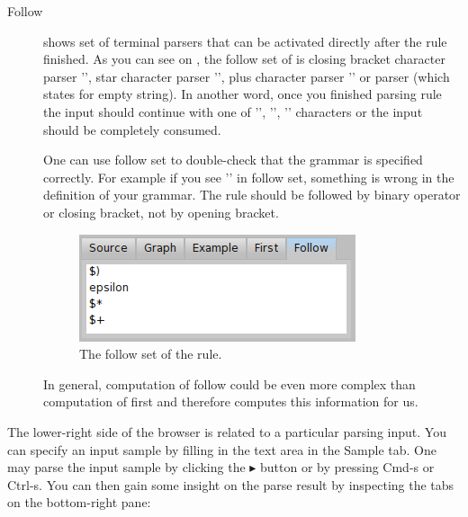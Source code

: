 \documentclass[a4paper,10pt,twoside]{book}
\begin{document}
\begin{description}
\item[Follow] shows set of terminal parsers that can be activated directly 
    after the rule finished.
  As you can see on , the follow set of  is 
    closing bracket character parser '\ct{)}', star character parser '\ct{*}', 
    plus character parser '\ct{+}' or  parser (which states for empty string).
  In another word, once you finished parsing  rule the input should
    continue with one of '\ct{)}', '\ct{*}', '\ct{+}' characters or the input should be completely consumed.
  
  One can use follow set to double-check that the grammar is specified correctly.
  For example if you see '\ct{(}' in  follow set, something is wrong
    in the definition of your grammar. 
  The  rule should be followed by binary operator or closing bracket, not 
    by opening bracket.
  
  \begin{figure}[ht]
    \begin{center}
      \includegraphics[width=.4\linewidth]{PPBrowserFollow}
      \caption{The follow set of the 
        rule. \label{fig:pp/browserFollow}}
    \end{center}
  \end{figure}
  
  In general, computation of follow could be even more complex than computation
    of first and therefore  computes this information for us.  

\end{description}

\noindent The lower-right side of the browser is related to a particular parsing input.
You can specify an input sample by filling in the text area in the Sample tab.
One may  parse the input sample by clicking the  \textsf{\small{$\blacktriangleright$}} button or by pressing Cmd-s or Ctrl-s.
You can then gain some insight on the parse result by inspecting the
tabs on the bottom-right pane:
\end{document}
